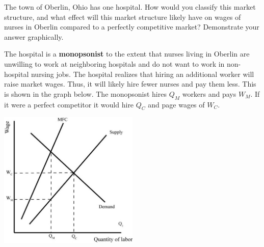 \documentclass[12pt]{exam}
\begin{document}
\begin{questions}
    \question The town of Oberlin, Ohio has one hospital. How would you classify this market structure, and what effect will this market structure likely have on wages of nurses in Oberlin compared to a perfectly competitive market? Demonstrate your answer graphically.

    \begin{solution}
        The hospital is a \textbf{monopsonist} to the extent that nurses living in Oberlin are unwilling to work at neighboring hospitals and do not want to work in non-hospital nursing jobs. The hospital realizes that hiring an additional worker will raise market wages. Thus, it will likely hire fewer nurses and pay them less. This is shown in the graph below. The monopsonist hires $Q_M$ workers and pays $W_M$. If it were a perfect competitor it would hire $Q_C$ and page wages of $W_C$.

        \includegraphics[width=0.5\textwidth]{images/monopsony.jpg}
    \end{solution}

\end{questions}
\end{document}
